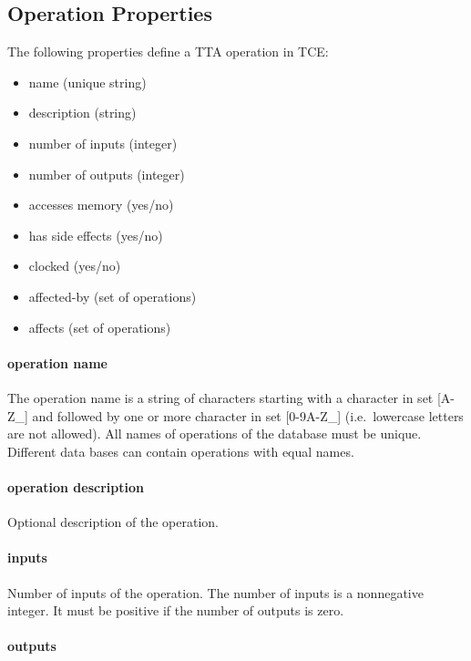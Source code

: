 \documentclass[twoside]{tceusermanual}
\begin{document}
\subsection{Operation Properties}
\label{ssec:operation-properties}

The following properties define a TTA operation in TCE:

\begin{itemize}
\item name (unique string)
\item description (string)
\item number of inputs (integer)
\item number of outputs (integer)
\item accesses memory (yes/no)
\item has side effects (yes/no)
\item clocked (yes/no)
\item affected-by (set of operations)
\item affects (set of operations)
\end{itemize}

\paragraph{operation name}
The operation name is a string of characters starting with a character in
set [A-Z\_] and followed by one or more character in set [0-9A-Z\_] 
(i.e.\ lowercase letters are not allowed).  All
names of operations of the database must be unique. Different data bases 
can contain operations with equal names. 

\paragraph{operation description}
Optional description of the operation.

\paragraph{inputs}
Number of inputs of the operation. The number of inputs is a
nonnegative integer. It must be positive if the number of outputs is
zero.

\paragraph{outputs}
\end{document}

